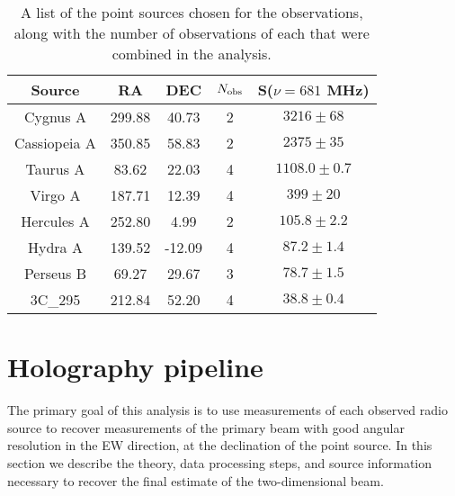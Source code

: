 \begin{table}[ht]
\caption{A list of the point sources chosen for the observations, along with the number of observations of each that were combined in the analysis.} 
\label{tab1}
\begin{center}
\begin{tabular}{| c  | c | c | c | c |  }
\hline
 Source  & RA    &        DEC    &  $N_{\rm obs}$ & S($\nu=681$ MHz) \\ \hline
Cygnus A & 299.88  & 40.73  & 2 & $3216 \pm 68$ \\ \hline
Cassiopeia A & 350.85 & 58.83 & 2 & $ 2375 \pm 35 $ \\ \hline
Taurus A & 83.62  & 22.03   & 4  & $1108.0 \pm 0.7$ \\ \hline
Virgo A & 187.71 & 12.39  & 4 & $399 \pm 20$\\ \hline
Hercules A & 252.80   & 4.99  & 2   & $105.8 \pm 2.2$  \\ \hline
Hydra A & 139.52  & -12.09  & 4 & $87.2 \pm 1.4$ \\ \hline
Perseus B  & 69.27  & 29.67  &  3  & $78.7 \pm 1.5$ \\ \hline
3C\_295 & 212.84  & 52.20 & 4   & $38.8 \pm 0.4$\\ \hline
\end{tabular}
\end{center}
\end{table}

\section{Holography pipeline} \label{ch:hol:sec:data}
The primary goal of this analysis is to use measurements of each observed radio source to recover measurements of the primary beam with good angular resolution in the EW direction, at the declination of the point source. In this section we describe the theory, data processing steps, and source information necessary to recover the final estimate of the two-dimensional beam. 


